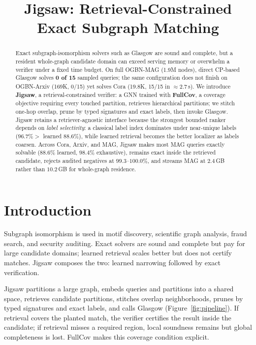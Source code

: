 \documentclass[runningheads]{llncs}
\begin{document}
\title{Jigsaw: Retrieval-Constrained Exact Subgraph Matching}
\author{}
\institute{}
\maketitle

\begin{abstract}
Exact subgraph-isomorphism solvers such as Glasgow are sound and complete, but a resident whole-graph candidate domain can exceed serving memory or overwhelm a verifier under a fixed time budget. On full OGBN-MAG (1.9M nodes), direct CP-based Glasgow solves \textbf{0 of 15} sampled queries; the same configuration does not finish on OGBN-Arxiv (169K, 0/15) yet solves Cora (19.8K, 15/15 in ${\approx}2.7$\,s). We introduce \textbf{Jigsaw}, a retrieval-constrained verifier: a GNN trained with \textbf{FullCov}, a coverage objective requiring every touched partition, retrieves hierarchical partitions; we stitch one-hop overlap, prune by typed signatures and exact labels, then invoke Glasgow. Jigsaw retains a retriever-agnostic interface because the strongest bounded ranker depends on \emph{label selectivity}: a classical label index dominates under near-unique labels ($96.7\%>$ learned $88.6\%$), while learned retrieval becomes the better localizer as labels coarsen. Across Cora, Arxiv, and MAG, Jigsaw makes most MAG queries exactly solvable ($88.6\%$ learned, $98.4\%$ exhaustive), remains exact inside the retrieved candidate, rejects audited negatives at $99.3$--$100.0\%$, and streams MAG at $2.4$\,GB rather than $10.2$\,GB for whole-graph residence.
\end{abstract}

\section{Introduction}

Subgraph isomorphism is used in motif discovery, scientific graph analysis, fraud search, and security auditing. Exact solvers are sound and complete but pay for large candidate domains; learned retrieval scales better but does not certify matches. Jigsaw composes the two: learned narrowing followed by exact verification.

Jigsaw partitions a large graph, embeds queries and partitions into a shared space, retrieves candidate partitions, stitches overlap neighborhoods, prunes by typed signatures and exact labels, and calls Glasgow (Figure~\ref{fig:pipeline}). If retrieval covers the planted match, the verifier certifies the result inside the candidate; if retrieval misses a required region, local soundness remains but global completeness is lost. FullCov makes this coverage condition explicit.
\end{document}

